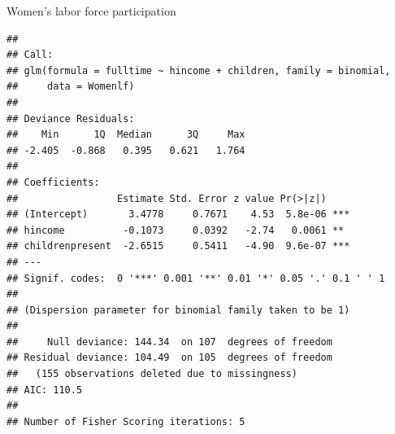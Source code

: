 \documentclass[11pt]{book}
\renewenvironment{knitrout}{\small\renewcommand{\baselinestretch}{.85}}{} %
\begin{document}
\begin{Example}[wlfpart1]{Women's labor force participation}
\begin{knitrout}
\begin{kframe}
\begin{alltt}
 \hlkwb{<-}  \hlopt{~}  \hlopt{+}  
\end{alltt}
\begin{verbatim}
## 
## Call:
## glm(formula = fulltime ~ hincome + children, family = binomial, 
##     data = Womenlf)
## 
## Deviance Residuals: 
##    Min      1Q  Median      3Q     Max  
## -2.405  -0.868   0.395   0.621   1.764  
## 
## Coefficients:
##                 Estimate Std. Error z value Pr(>|z|)    
## (Intercept)       3.4778     0.7671    4.53  5.8e-06 ***
## hincome          -0.1073     0.0392   -2.74   0.0061 ** 
## childrenpresent  -2.6515     0.5411   -4.90  9.6e-07 ***
## ---
## Signif. codes:  0 '***' 0.001 '**' 0.01 '*' 0.05 '.' 0.1 ' ' 1
## 
## (Dispersion parameter for binomial family taken to be 1)
## 
##     Null deviance: 144.34  on 107  degrees of freedom
## Residual deviance: 104.49  on 105  degrees of freedom
##   (155 observations deleted due to missingness)
## AIC: 110.5
## 
## Number of Fisher Scoring iterations: 5
\end{verbatim}
\end{kframe}
\end{knitrout}


\end{Example}
\end{document}
